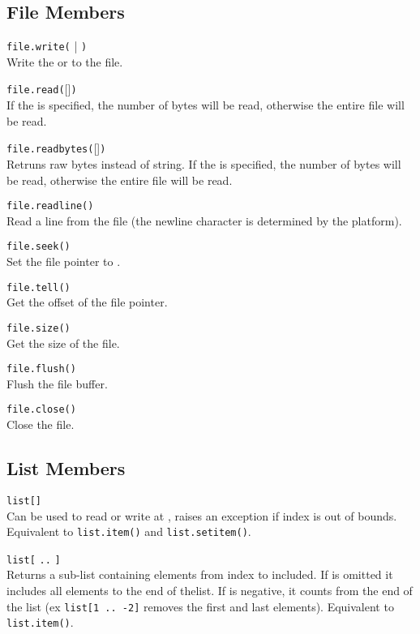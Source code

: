 \subsection*{File Members}

\hangpar \texttt{file.write(} | \texttt{)}\\
Write the  or to the file.

\hangpar \texttt{file.read(}[]\texttt{)}\\
If the  is specified, the number of bytes will be read, otherwise the entire file will be read.

\hangpar \texttt{file.readbytes(}[]\texttt{)}\\
Retruns raw bytes instead of string. If the  is specified, the number of bytes will be read, otherwise the entire file will be read.

\hangpar \texttt{file.readline()}\\
Read a line from the file (the newline character is determined by the platform).

\hangpar \texttt{file.seek(}\texttt{)}\\
Set the file pointer to .

\hangpar \texttt{file.tell()}\\
Get the offset of the file pointer.

\hangpar \texttt{file.size()}\\
Get the size of the file.

\hangpar \texttt{file.flush()}\\
Flush the file buffer.

\hangpar \texttt{file.close()}\\
Close the file.

\subsection*{List Members}

\hangpar  \texttt{list[}\texttt{]}\\
Can be used to read or write at , raises an exception if index is out of bounds. Equivalent to \texttt{list.item()} and \texttt{list.setitem()}.

\hangpar  \texttt{list[} \texttt{..} \texttt{]}\\
Returns a sub-list containing elements from index  to  included. If  is omitted it includes all elements to the end of thelist. If  is negative, it counts from the end of the list (ex \texttt{list[1 .. -2]} removes the first and last elements). Equivalent to \texttt{list.item()}.

